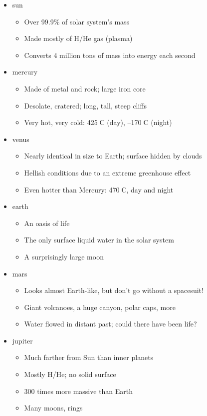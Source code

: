 \begin{itemize}
\item sun
\begin{itemize}
\item Over 99.9\% of solar system's mass
\item Made mostly of H/He gas (plasma)
\item Converts 4 million tons of mass into energy each second
\end{itemize}
\item mercury
\begin{itemize}
\item Made of metal and rock; large iron core
\item Desolate, cratered; long, tall, steep cliffs
\item Very hot, very cold: 425C (day), –170C (night)
\end{itemize}
\item venus
\begin{itemize}
\item Nearly identical in size to Earth; surface hidden by clouds
\item Hellish conditions due to an extreme greenhouse effect
\item Even hotter than Mercury: 470C, day and night
\end{itemize}
\item earth
\begin{itemize}
\item An oasis of life
\item The only surface liquid water in the solar system
\item A surprisingly large moon
\end{itemize}
\item mars
\begin{itemize}
\item Looks almost Earth-like, but don't go without a spacesuit!
\item Giant volcanoes, a huge canyon, polar caps, more
\item Water flowed in distant past; could there have been life?
\end{itemize}
\item jupiter
\begin{itemize}
\item Much farther from Sun than inner planets
\item Mostly H/He; no solid surface
\item 300 times more massive than Earth
\item Many moons, rings

\end{itemize}
\end{itemize}
